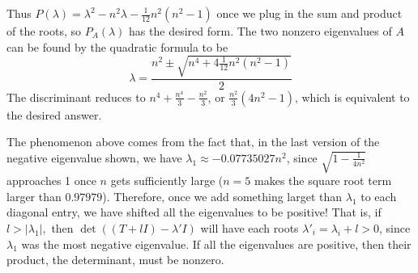 \documentclass{article}
\begin{document}
Thus $P(\lambda) = \lambda^2 - n^2\lambda - \frac{1}{12}n^2(n^2-1)$ once we plug in the sum and product of the roots, so $P_A(\lambda)$ has the desired form.
The two nonzero eigenvalues of $A$ can be found by the quadratic formula to be
\[\lambda =  \frac{n^2 \pm \sqrt{n^4 + 4 \frac{1}{12} n^2(n^2-1)}}{2}\]
The discriminant reduces to $n^4 + \frac{n^4}{3} - \frac{n^2}{3}$, or 
$\frac{n^2}{3}(4n^2 - 1)$, which is equivalent to the desired answer.

The phenomenon above comes from the fact that, in the last version of the negative eigenvalue shown, we have $\lambda_1 \approx -0.07735027 n^2$, since $\sqrt{1 - \frac{1}{4n^2}}$ approaches 1 once $n$ gets sufficiently large ($n = 5$ makes the square root term larger than $0.97979$).
Therefore, once we add something larget than $\lambda_1$ to each diagonal entry, we have shifted all the eigenvalues to be positive!
That is, if $l > |\lambda_1|,$ then $\det((T + lI) - \lambda' I)$ will have each roots $\lambda'_i = \lambda_i + l > 0$, since $\lambda_1$ was the most negative eigenvalue.
If all the eigenvalues are positive, then their product, the determinant, must be nonzero.
\end{document}

